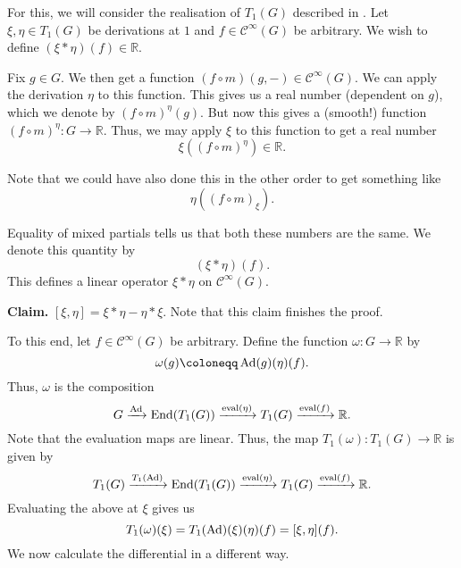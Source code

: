 \documentclass[12pt]{article}
\begin{document}
\begin{sketch}
	For this, we will consider the realisation of $T_{1}(G)$ described in . 
	Let $\xi, \eta \in T_{1}(G)$ be derivations at $1$ and $f \in \mathcal{C}^{\infty}(G)$ be arbitrary. 
	We wish to define $(\xi \ast \eta)(f) \in \mathbb{R}$. 

	Fix $g \in G$. We then get a function $(f \circ m)(g, -) \in \mathcal{C}^{\infty}(G)$. 
	We can apply the derivation $\eta$ to this function. 
	This gives us a real number (dependent on $g$), which we denote by $(f \circ m)^{\eta}(g)$. 
	But now this gives a (smooth!) function $(f \circ m)^{\eta} \colon G \to \mathbb{R}$. 
	Thus, we may apply $\xi$ to this function to get a real number
	\begin{equation*} 
		\xi\left((f \circ m)^{\eta}\right) \in \mathbb{R}.
	\end{equation*}

	Note that we could have also done this in the other order to get something like
	\begin{equation*} 
		\eta\left((f \circ m)_{\xi}\right).
	\end{equation*}

	Equality of mixed partials tells us that both these numbers are the same. 
	We denote this quantity by
	\begin{equation*} 
		(\xi \ast \eta)(f).
	\end{equation*}
	This defines a linear operator $\xi \ast \eta$ on $\mathcal{C}^{\infty}(G)$.

	\textbf{Claim.} $[\xi, \eta] = \xi \ast \eta - \eta \ast \xi$. \newline
	Note that this claim finishes the proof.

	To this end, let $f \in \mathcal{C}^{\infty}(G)$ be arbitrary. 
	Define the function $\omega \colon G \to \mathbb{R}$ by
	\begin{equation*} 
		\omega(g) \coloneqq \Ad(g)(\eta)(f).
	\end{equation*}
	Thus, $\omega$ is the composition
	\begin{equation*} 
		G \xrightarrow{\operatorname{Ad}} \operatorname{End}(T_{1}(G)) \xrightarrow{\operatorname{eval}(\eta)} T_{1}(G) \xrightarrow{\operatorname{eval}(f)} \mathbb{R}.
	\end{equation*}
	Note that the evaluation maps are linear.
	Thus, the map $T_{1}(\omega) \colon T_{1}(G) \to \mathbb{R}$ is given by
	\begin{equation*} 
		T_{1}(G) \xrightarrow{T_{1}(\operatorname{Ad})} \operatorname{End}(T_{1}(G)) \xrightarrow{\operatorname{eval}(\eta)} T_{1}(G) \xrightarrow{\operatorname{eval}(f)} \mathbb{R}.
	\end{equation*}
	Evaluating the above at $\xi$ gives us
	\begin{equation} \label{eq:t1-omega-commutator}
		T_{1}(\omega)(\xi) = T_{1}(\operatorname{Ad})(\xi)(\eta)(f) = [\xi, \eta](f).
	\end{equation}
	We now calculate the differential in a different way.


\end{sketch}
\end{document}
